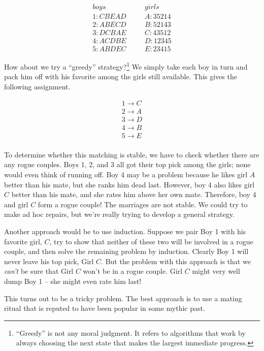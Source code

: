 \begin{eqnarray*}
boys & \quad & girls \\
1 : C B E A D & \quad & A : 3 5 2 1 4 \\
2 : A B E C D & \quad & B : 5 2 1 4 3 \\
3 : D C B A E & \quad & C : 4 3 5 1 2 \\
4 : A C D B E & \quad & D : 1 2 3 4 5 \\
5 : A B D E C & \quad & E : 2 3 4 1 5
\end{eqnarray*}

How about we try a ``greedy'' strategy?\footnote{``Greedy'' is not any
moral judgment.  It refers to algorithms that work by always choosing the
next state that makes the largest immediate progress.}  We simply take
each boy in turn and pack him off with his favorite among the girls still
available.  This gives the following assignment.

\begin{eqnarray*}
1 \rightarrow C \\
2 \rightarrow A \\
3 \rightarrow D \\
4 \rightarrow B \\
5 \rightarrow E \\
\end{eqnarray*}

To determine whether this matching is stable, we have to check whether
there are any rogue couples.  Boys 1, 2, and 3 all got their top pick
among the girls; none would even think of running off.  Boy 4 may be a
problem because he likes girl $A$ better than his mate, but she ranks him
dead last.  However, boy 4 also likes girl $C$ better than his mate, and
she rates him above her own mate.  Therefore, boy 4 and girl $C$ form a
rogue couple!  The marriages are not stable.  We could try to make ad hoc
repairs, but we're really trying to develop a general strategy.

Another approach would be to use induction.  Suppose we pair Boy 1 with
his favorite girl, $C$, try to show that neither of these two will be
involved in a rogue couple, and then solve the remaining problem by
induction.  Clearly Boy 1 will never leave his top pick, Girl $C$.  But
the problem with this approach is that we \emph{can't} be sure that Girl
$C$ won't be in a rogue couple.  Girl $C$ might very well dump Boy 1 --
she might even rate him last!

This turns out to be a tricky problem.  The best approach is to use a
mating ritual that is reputed to have been popular in some mythic past.
\fi

